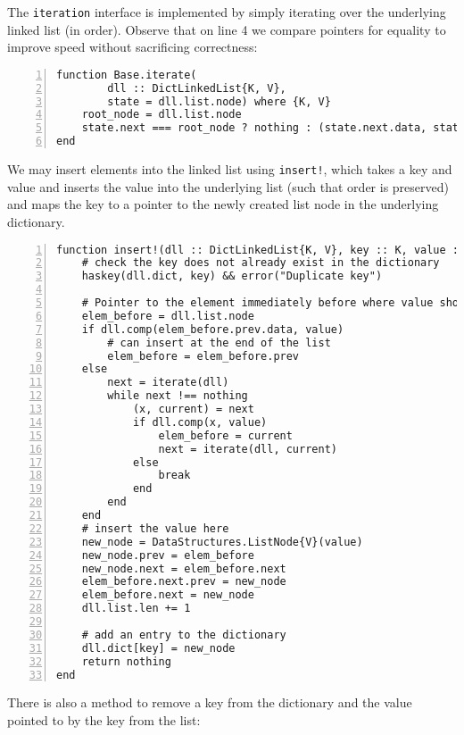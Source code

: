 \documentclass{article}
\theoremstyle{plain}
\numberwithin{theorem}{section}
\numberwithin{example}{section}
\theoremstyle{definition}
\numberwithin{definition}{section}
\begin{document}
The \texttt{iteration} interface is implemented by simply iterating over the
underlying linked list (in order). Observe that on line 4 we compare pointers
for equality to improve speed without sacrificing correctness:

\begin{codebox}
    \begin{Verbatim}[numbers=left,xleftmargin=5mm]
function Base.iterate(
        dll :: DictLinkedList{K, V},
        state = dll.list.node) where {K, V}
    root_node = dll.list.node
    state.next === root_node ? nothing : (state.next.data, state.next)
end
    \end{Verbatim}
\end{codebox}

We may insert elements into the linked list
using \texttt{insert!}, which takes a key and value and inserts the value into
the underlying list (such that order is preserved) and maps the key to a pointer
to the newly created list node in the underlying dictionary.

\begin{codebox}
    \begin{Verbatim}[numbers=left,xleftmargin=5mm]
function insert!(dll :: DictLinkedList{K, V}, key :: K, value :: V) where {K, V}
    # check the key does not already exist in the dictionary
    haskey(dll.dict, key) && error("Duplicate key")

    # Pointer to the element immediately before where value should be inserted
    elem_before = dll.list.node
    if dll.comp(elem_before.prev.data, value)
        # can insert at the end of the list
        elem_before = elem_before.prev
    else
        next = iterate(dll)
        while next !== nothing
            (x, current) = next
            if dll.comp(x, value)
                elem_before = current
                next = iterate(dll, current)
            else
                break
            end
        end
    end
    # insert the value here
    new_node = DataStructures.ListNode{V}(value)
    new_node.prev = elem_before
    new_node.next = elem_before.next
    elem_before.next.prev = new_node
    elem_before.next = new_node
    dll.list.len += 1

    # add an entry to the dictionary
    dll.dict[key] = new_node
    return nothing
end
    \end{Verbatim}
\end{codebox}

There is also a method to remove a key from the dictionary and the value pointed
to by the key from the list:
\end{document}
